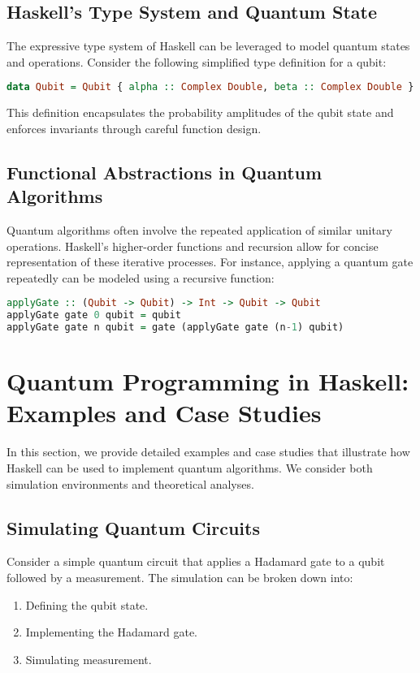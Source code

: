 \documentclass[12pt]{article}
\begin{document}
\subsection{Haskell's Type System and Quantum State}
The expressive type system of Haskell can be leveraged to model quantum states and operations. Consider the following simplified type definition for a qubit:
\begin{lstlisting}[language=Haskell]
data Qubit = Qubit { alpha :: Complex Double, beta :: Complex Double }
\end{lstlisting}
This definition encapsulates the probability amplitudes of the qubit state and enforces invariants through careful function design.

\subsection{Functional Abstractions in Quantum Algorithms}
Quantum algorithms often involve the repeated application of similar unitary operations. Haskell's higher-order functions and recursion allow for concise representation of these iterative processes. For instance, applying a quantum gate repeatedly can be modeled using a recursive function:
\begin{lstlisting}[language=Haskell]
applyGate :: (Qubit -> Qubit) -> Int -> Qubit -> Qubit
applyGate gate 0 qubit = qubit
applyGate gate n qubit = gate (applyGate gate (n-1) qubit)
\end{lstlisting}

\section{Quantum Programming in Haskell: Examples and Case Studies}
\label{sec:quantumHaskell}
In this section, we provide detailed examples and case studies that illustrate how Haskell can be used to implement quantum algorithms. We consider both simulation environments and theoretical analyses.

\subsection{Simulating Quantum Circuits}
Consider a simple quantum circuit that applies a Hadamard gate to a qubit followed by a measurement. The simulation can be broken down into:
\begin{enumerate}
    \item Defining the qubit state.
    \item Implementing the Hadamard gate.
    \item Simulating measurement.
\end{enumerate}
\end{document}
